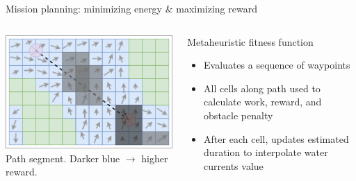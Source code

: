 \documentclass[9pt,xcolor=table]{beamer}
\begin{document}
\begin{frame}{Mission planning: minimizing energy \& maximizing reward}
    \begin{columns}
        \begin{column}{0.5\textwidth}
    \includegraphics[width=\textwidth,trim={0cm 0cm 0cm 0cm},clip]{img/segment_.png} \\
        {\tiny Path segment. Darker blue $\rightarrow$ higher reward.}
        \end{column}
        \begin{column}{0.5\textwidth}
            \begin{block}{Metaheuristic fitness function}
                \begin{itemize}
                    \item Evaluates a sequence of waypoints
                    \item All cells along path used to calculate work, reward, and obstacle penalty
                    \item After each cell, updates estimated duration to interpolate water currents value
                \end{itemize}
            \end{block}
        \end{column}        
    \end{columns}
    
\end{frame}
\end{document}
